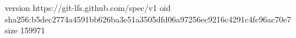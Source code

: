 version https://git-lfs.github.com/spec/v1
oid sha256:b5dec2774a4591bb626ba3e51a3505dfd06a97256ec9216c4291c4fc96ac70e7
size 159971
